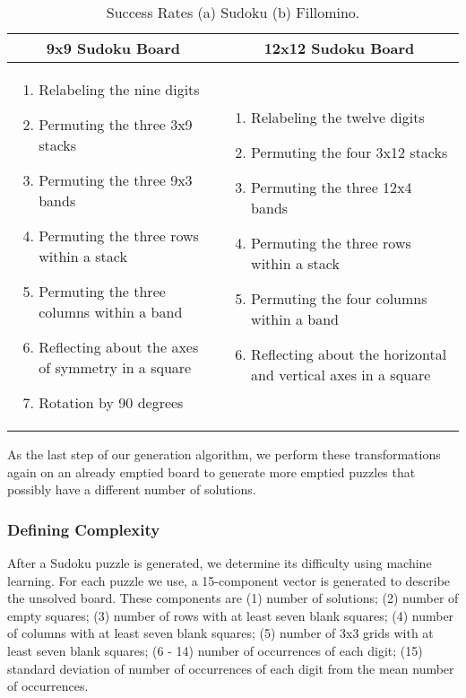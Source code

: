 \singlespace
\begin{table}
\begin{tabularx}{\textwidth}{|X|X|}
\hline
\multicolumn{1}{|c}{9x9 Sudoku Board} & \multicolumn{1}{|c|}{12x12 Sudoku Board}
\\
\hline
\begin{enumerate}
\item Relabeling the nine digits
\item Permuting the three 3x9 stacks
\item Permuting the three 9x3 bands
\item Permuting the three rows within a stack
\item Permuting the three columns within a band
\item Reflecting about the axes of symmetry in a square
\item Rotation by 90 degrees
\end{enumerate} &

\begin{enumerate}
\item Relabeling the twelve digits
\item Permuting the four 3x12 stacks
\item Permuting the three 12x4 bands
\item Permuting the three rows within a stack
\item Permuting the four columns within a band
\item Reflecting about the horizontal and vertical axes in a square
\end{enumerate}
 \\
\hline
\end{tabularx}
\caption{Success Rates (a) Sudoku (b) Fillomino.}
\label{transformations}
\end{table}
\doublespace

As the last step of our generation algorithm, we perform these transformations again on an already emptied board to generate more emptied puzzles that possibly have a different number of solutions.


\subsubsection*{Defining Complexity}
After a Sudoku puzzle is generated, we determine its difficulty using
machine learning. For each puzzle we use, a 15-component vector is generated to describe the unsolved board. These components are (1) number of solutions; (2) number of empty squares; (3) number of rows with at least seven blank squares; (4) number of columns with at least seven blank squares; (5) number of 3x3 grids with at least seven blank squares; (6 - 14) number of occurrences of each digit; (15) standard deviation of number of occurrences of each digit from the mean number of occurrences.

